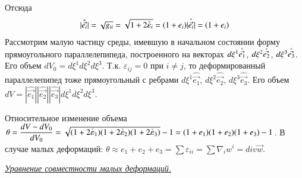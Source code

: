 Отсюда 
$$ |\hat{\vec{e_i}}| = \sqrt{g_{ii}} = \sqrt{1 + 2\accentset{\circ}{\varepsilon}_{i}} = (1+e_i)|\accentset{\circ}{\vec{e_i}}| = (1+e_i)
$$
Рассмотрим малую частицу среды, имевшую в начальном состоянии форму прямоугольного параллелепипеда, построенного на векторах $d\xi^1\accentset{\circ}{\vec{e_1}}$, $d\xi^2\accentset{\circ}{\vec{e_2}}$, $d\xi^3\accentset{\circ}{\vec{e_3}}$. Его объем $dV_0 = d\xi^1d\xi^2d\xi^3$. Т.к. $\varepsilon_{ij} = 0$ при $i \not= j$, то деформированный параллелепипед тоже прямоугольный с ребрами $d\xi^1\hat{\vec{e_1}}$, $d\xi^2\hat{\vec{e_2}}$, $d\xi^3\hat{\vec{e_3}}$. Его объем $dV = |\hat{\vec{e_1}}||\hat{\vec{e_2}}||\hat{\vec{e_3}}|d\xi^1d\xi^2d\xi^3$.
\begin{figure}[H]
	\centering{}
	\label{fig4}
\end{figure}
Относительное изменение объема $\theta = \dfrac{dV - dV_{0}}{dV_{0}} = \sqrt{(1+2\accentset{\circ}{\varepsilon}_{1})(1+2\accentset{\circ}{\varepsilon}_{2})(1+2\accentset{\circ}{\varepsilon}_{3})} - 1 = (1+e_1)(1+e_2)(1+e_3) - 1$. В случае малых деформаций: $\theta \approx e_1 + e_2 + e_3 = \sum\varepsilon_{ii} = \sum\nabla_iw^i = div {\vec w}$.


\begin{center}
	\textit{\underline{Уравнение совместности малых деформаций.}}
\end{center}

